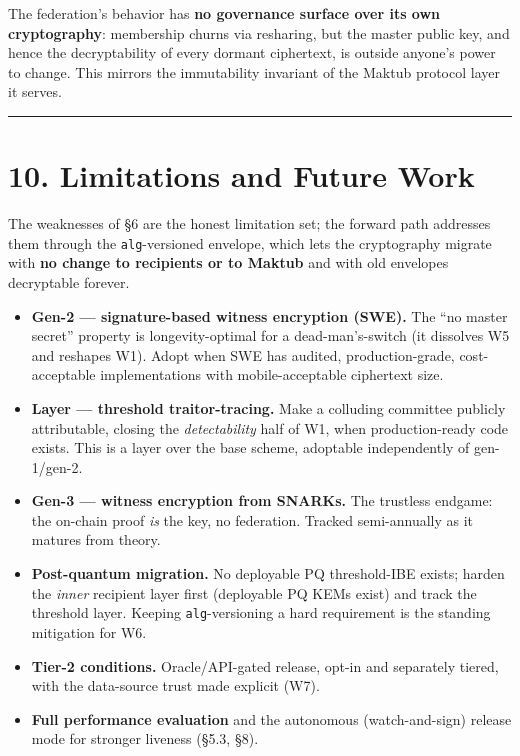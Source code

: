 \documentclass[
  11pt,
]{article}
\providecommand{\tightlist}{%
  \setlength{\itemsep}{0pt}\setlength{\parskip}{0pt}}
\begin{document}
The federation's behavior has \textbf{no governance surface over its own
cryptography}: membership churns via resharing, but the master public
key, and hence the decryptability of every dormant ciphertext, is
outside anyone's power to change. This mirrors the immutability
invariant of the Maktub protocol layer it serves.

\begin{center}\rule{0.5\linewidth}{0.5pt}\end{center}

\section{10. Limitations and Future
Work}\label{limitations-and-future-work}

The weaknesses of §6 are the honest limitation set; the forward path
addresses them through the \texttt{alg}-versioned envelope, which lets
the cryptography migrate with \textbf{no change to recipients or to
Maktub} and with old envelopes decryptable forever.

\begin{itemize}
\tightlist
\item
  \textbf{Gen-2 --- signature-based witness encryption (SWE).} The ``no
  master secret'' property is longevity-optimal for a dead-man's-switch
  (it dissolves W5 and reshapes W1). Adopt when SWE has audited,
  production-grade, cost-acceptable implementations with
  mobile-acceptable ciphertext size.
\item
  \textbf{Layer --- threshold traitor-tracing.} Make a colluding
  committee publicly attributable, closing the \emph{detectability} half
  of W1, when production-ready code exists. This is a layer over the
  base scheme, adoptable independently of gen-1/gen-2.
\item
  \textbf{Gen-3 --- witness encryption from SNARKs.} The trustless
  endgame: the on-chain proof \emph{is} the key, no federation. Tracked
  semi-annually as it matures from theory.
\item
  \textbf{Post-quantum migration.} No deployable PQ threshold-IBE
  exists; harden the \emph{inner} recipient layer first (deployable PQ
  KEMs exist) and track the threshold layer. Keeping
  \texttt{alg}-versioning a hard requirement is the standing mitigation
  for W6.
\item
  \textbf{Tier-2 conditions.} Oracle/API-gated release, opt-in and
  separately tiered, with the data-source trust made explicit (W7).
\item
  \textbf{Full performance evaluation} and the autonomous
  (watch-and-sign) release mode for stronger liveness (§5.3, §8).
\end{itemize}
\end{document}
